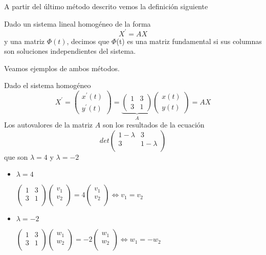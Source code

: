 \documentclass{mathnotes}
\begin{document}
A partir del último método descrito vemos la definición siguiente

\begin{definition}
Dado un sistema lineal homogéneo de la forma $$X^\prime = AX$$
y una matriz $\Phi(t)$, decimos que $\Phi$(t) es una matriz fundamental si sus columnas son soluciones independientes del sistema.
\end{definition}

Veamos ejemplos de ambos métodos.

\begin{example} [(Método 1)]
Dado el sistema homogéneo$$X^\prime = \begin{pmatrix}
x^\prime(t)\\y^\prime(t)
\end{pmatrix}
= \underbrace{\begin{pmatrix}
1 & 3\\3 & 1
\end{pmatrix}}_{A}\begin{pmatrix}
x(t)\\y(t)
\end{pmatrix} = AX$$
Los autovalores de la matriz $A$ son los resultados de la ecuación $$det\begin{pmatrix}
1-\lambda & 3\\3 &1-\lambda\\
\end{pmatrix}$$
que son $\lambda = 4$ y $\lambda = -2$
\begin{itemize}
\item $\lambda = 4$

$\begin{pmatrix}
1 & 3\\ 3 & 1\\
\end{pmatrix}\begin{pmatrix}
v_1\\v_2\\
\end{pmatrix} = 4\begin{pmatrix}
v_1\\v_2\\
\end{pmatrix} \iff v_1 = v_2$

\item $\lambda = -2$

$\begin{pmatrix}
1 & 3\\ 3 & 1\\
\end{pmatrix}\begin{pmatrix}
w_1\\w_2\\
\end{pmatrix} = -2\begin{pmatrix}
w_1\\w_2\\
\end{pmatrix} \iff w_1 = -w_2$
\end{itemize}


\end{example}
\end{document}
